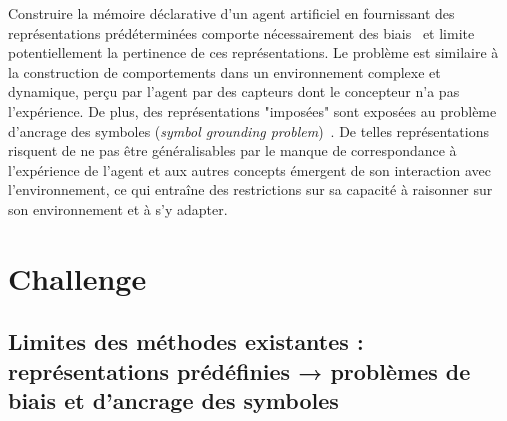 Construire la mémoire déclarative d'un agent artificiel en fournissant des représentations prédéterminées comporte nécessairement des biais~\cite{Nagel1974What} et limite potentiellement la pertinence de ces représentations. Le problème est similaire à la construction de comportements dans un environnement complexe et dynamique, perçu par l'agent par des capteurs dont le concepteur n'a pas l'expérience. De plus, des représentations "imposées" sont exposées au problème d'ancrage des symboles (\textit{symbol grounding problem})~\cite{steels2008symbol}. De telles représentations risquent de ne pas être généralisables par le manque de correspondance à l'expérience de l'agent et aux autres concepts émergent de son interaction avec l'environnement, ce qui entraîne des restrictions sur sa capacité à raisonner sur son environnement et à s'y adapter.



\section{Challenge}
\subsection{Limites des méthodes existantes : représentations prédéfinies → problèmes de biais et d'ancrage des symboles}